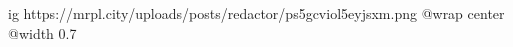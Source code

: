  
 
 
 
 

\ifcmt
  ig https://mrpl.city/uploads/posts/redactor/ps5gcviol5eyjsxm.png
  @wrap center
  @width 0.7
\fi
